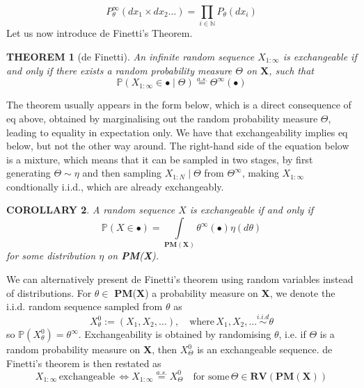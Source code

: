 \documentclass[12pt]{report}
\newtheorem{theorem}{THEOREM}
\newtheorem{corollary}[theorem]{COROLLARY}
\newcommand{\bs}{\boldsymbol}
\newcommand{\mb}[1]{\mathbb{#1}}
\renewcommand{\bs}{\boldsymbol}
\begin{document}
\begin{equation}
    P_\theta^\infty(dx_1 \times dx_2 \dots) = \prod\limits_{i \in \mb{N}} P_\theta(dx_i)
\end{equation}
Let us now introduce de Finetti's Theorem.

\begin{theorem}[de Finetti]
    An infinite random sequence $X_{1:\infty}$ is exchangeable if and only if there exists a random probability measure $\Theta$ on $\bs{X}$, such that
    \begin{equation}
        \mb{P}(X_{1:\infty} \in \bullet \mid \Theta) \overset{a.s.}{=} \Theta^\infty(\bullet)
    \end{equation}
\end{theorem}

The theorem usually appears in the form below, which is a direct consequence of eq above, obtained by marginalising out the random probability measure $\Theta$, leading to equality in expectation only. We have that exchangeability implies eq below, but not the other way around. The right-hand side of the equation below is a mixture, which means that it can be sampled in two stages, by first generating $\Theta \sim \eta$ and then sampling $X_{1:N} \mid \Theta$ from $\Theta^\infty$, making $X_{1:\infty}$ condtionally i.i.d., which are already exchangeably. \\

\begin{corollary}
    A random sequence $X$ is exchangeable if and only if 
    \begin{equation}
        \mb{P}(X \in \bullet) = \int\limits_{\bs{P}\bs{M}(\bs{X})} \theta^\infty(\bullet) \eta(d\theta)
    \end{equation}
    for some distribution $\eta$ on \textbf{PM}(\textbf{X}).
\end{corollary}

We can alternatively present de Finetti's theorem using random variables instead of distributions. For $\theta \in$ \textbf{PM}(\textbf{X}) a probability measure on \textbf{X}, we denote the i.i.d. random sequence sampled from $\theta$ as
\begin{equation*}
    X_\theta^0 := (X_1, X_2,\dots),\quad\text{where}\, X_1, X_2,\dots \overset{i.i.d}{\sim} \theta
\end{equation*}
so $\mb{P}(X_\theta^0) = \theta^\infty$. Exchangeability is obtained by randomising $\theta$, i.e. if $\Theta$ is a random probability measure on \textbf{X}, then $X_\Theta^0$ is an exchangeable sequence. de Finetti's theorem is then restated as
\begin{equation}
    X_{1:\infty}\, \text{exchangeable}\, \Leftrightarrow X_{1:\infty} \overset{a.s.}{=} X_\Theta^0 \quad \text{for some}\, \Theta \in \bs{R}\bs{V}(\bs{P}\bs{M}(\bs{X}))
\end{equation}
\end{document}
